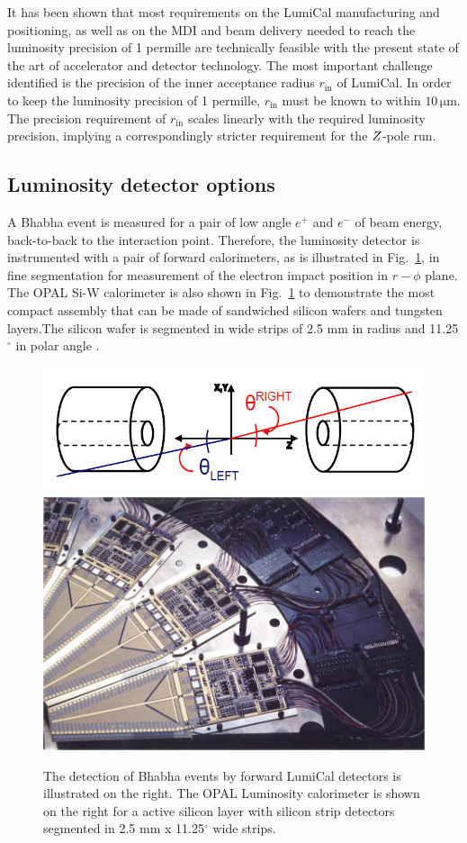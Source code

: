 It has been shown that most requirements on the LumiCal manufacturing and positioning, as well as on the MDI and beam delivery needed to reach the luminosity precision of 1 permille are technically feasible with the present state of the art of accelerator and detector technology. The most important challenge identified is the precision of the inner acceptance radius $r_{\text{in}}$ of LumiCal. In order to keep the luminosity precision of 1 permille, $r_{\text{in}}$ must be known to within $10\,\mathrm{\mu m}$. The precision requirement of $r_{\text{in}}$ scales linearly with the required luminosity precision, implying a correspondingly stricter requirement for the $Z$-pole run.


\subsection{Luminosity detector options }  %

A Bhabha event is measured for a pair of low angle $e^+$ and $e^-$ of beam energy, back-to-back to the interaction point. Therefore, the luminosity detector is instrumented with a pair of forward calorimeters, as is illustrated in Fig.~\ref{fig:opal_siw}, in fine segmentation for measurement of the electron impact position in $r-\phi$ plane. The OPAL Si-W calorimeter is also shown in Fig.~\ref{fig:opal_siw} to demonstrate the most compact assembly that can be made of sandwiched silicon wafers and tungsten layers.The silicon wafer is segmented in wide strips of 2.5 mm in radius and 11.25$^\circ$ in polar angle \cite{OPAL_SiW}.

\begin{figure}[b!]
	\centering
	\includegraphics[width=.45\linewidth]{Figures/MDI/Bhabha_lumical.png} 
	\hspace{.5cm}
	\includegraphics[width=.35\linewidth]{Figures/MDI/opal_siw.jpg} 
	\vspace{.2cm}
	\caption{   The detection of Bhabha events by forward LumiCal detectors is illustrated on the right. The OPAL Luminosity calorimeter is shown on the right for a active silicon layer with silicon strip detectors segmented in 2.5 mm x 11.25$^\circ$ wide strips.  
		\label{fig:opal_siw} }
\end{figure}


